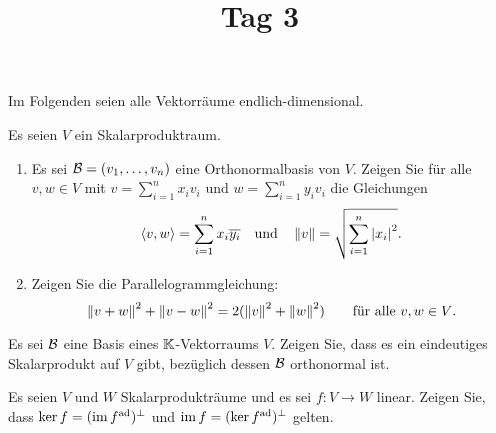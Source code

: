 \documentclass[a4paper, 10pt]{scrartcl}
\title{Tag 3}
\author{}
\date{}
\begin{document}
Im Folgenden seien alle Vektorräume endlich-dimensional.



\begin{question}
  Es seien $V$ ein Skalarproduktraum.
  \begin{enumerate}
    \item
      Es sei $\mathcal{B} = (v_1, \dotsc, v_n)$ eine Orthonormalbasis von $V$.
      Zeigen Sie für alle $v, w \in V$ mit $v = \sum_{i=1}^n x_i v_i$ und $w = \sum_{i=1}^n y_i v_i$ die Gleichungen
      \[
          \left\langle v, w \right\rangle
        = \sum_{i=1}^n x_i \overline{y_i}
        \quad\text{und}\quad
          \left\| v \right\|
        = \sqrt{ \sum_{i=1}^n \left| x_i \right|^2 }.
      \]
    \item
      Zeigen Sie die Parallelogrammgleichung:
      \[
          \left\| v + w \right\|^2 + \left\| v - w \right\|^2
        = 2( \left\| v \right\|^2 + \left\| w \right\|^2 )
        \qquad
        \text{für alle $v, w \in V$}.
      \]
  \end{enumerate}
\end{question}



\begin{question}[subtitle = Existenz von Skalarprodukten]
  Es sei $\mathcal{B}$ eine Basis eines $\mathbb{K}$-Vektorraums $V$.
  Zeigen Sie, dass es ein eindeutiges Skalarprodukt auf $V$ gibt, bezüglich dessen $\mathcal{B}$ orthonormal ist.
\end{question}










\begin{question}
  Es seien $V$ und $W$ Skalarprodukträume und es sei $f \colon V \to W$ linear.
  Zeigen Sie, dass $\ker f = (\operatorname{im} f^{\operatorname{ad}})^\perp$ und $\operatorname{im} f = (\ker f^{\operatorname{ad}})^\perp$ gelten.
\end{question}
\end{document}
